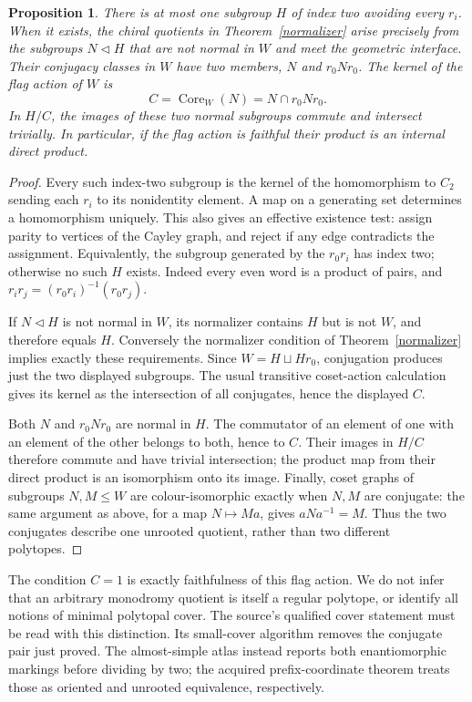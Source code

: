 \documentclass[11pt]{article}
\newtheorem{proposition}[theorem]{Proposition}
\begin{document}
\begin{proposition}\label{search}
There is at most one subgroup $H$ of index two avoiding every $r_i$.
When it exists, the chiral quotients in Theorem~\ref{normalizer} arise
precisely from the subgroups $N\lhd H$ that are not normal in $W$ and
meet the geometric interface. Their conjugacy classes in $W$ have two
members, $N$ and $r_0Nr_0$. The kernel of the flag action of $W$ is
\[
 C=\operatorname{Core}_W(N)=N\cap r_0Nr_0.
\]
In $H/C$, the images of these two normal subgroups commute and intersect
trivially. In particular, if the flag action is faithful their product
is an internal direct product.
\end{proposition}
\begin{proof}
Every such index-two subgroup is the kernel of the homomorphism to
$C_2$ sending each $r_i$ to its nonidentity element. A map on a generating
set determines a homomorphism uniquely. This also gives an effective
existence test: assign parity to vertices of the Cayley graph, and reject
if any edge contradicts the assignment. Equivalently, the subgroup
generated by the $r_0r_i$ has index two; otherwise no such $H$ exists.
Indeed every even word is a product of pairs, and
$r_ir_j=(r_0r_i)^{-1}(r_0r_j)$.

If $N\lhd H$ is not normal in $W$, its normalizer contains $H$ but is
not $W$, and therefore equals $H$. Conversely the normalizer condition
of Theorem~\ref{normalizer} implies exactly these requirements. Since
$W=H\sqcup Hr_0$, conjugation produces just the two displayed subgroups.
The usual transitive coset-action calculation gives its kernel as the
intersection of all conjugates, hence the displayed $C$.

Both $N$ and $r_0Nr_0$ are normal in $H$. The commutator of an element
of one with an element of the other belongs to both, hence to $C$.
Their images in $H/C$ therefore commute and have trivial intersection;
the product map from their direct product is an isomorphism onto its
image. Finally, coset graphs of subgroups $N,M\leq W$ are colour-isomorphic
exactly when $N,M$ are conjugate: the same argument as above, for a map
$N\mapsto Ma$, gives $aNa^{-1}=M$. Thus the two conjugates describe one
unrooted quotient, rather than two different polytopes.
\end{proof}

The condition $C=1$ is exactly faithfulness of this flag action. We do
not infer that an arbitrary monodromy quotient is itself a regular
polytope, or identify all notions of minimal polytopal cover. The source's
qualified cover statement must be read with this distinction. Its
small-cover algorithm removes the conjugate pair just proved. The
almost-simple atlas instead reports both enantiomorphic markings before
dividing by two; the acquired prefix-coordinate theorem treats those
as oriented and unrooted equivalence, respectively.
\end{document}
